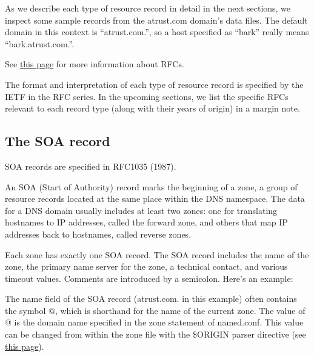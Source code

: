 As we describe each type of resource record in detail in the next
sections, we inspect some sample records from the atrust.com domain's
data files. The default domain in this context is ``atrust.com.'', so a
host specified as ``bark'' really means ``bark.atrust.com.''.

\leavevmode\hypertarget{part0024_split_021.htmlux5cux23_idContainer934}{}%
See
\protect\hyperlink{part0021_split_003.htmlux5cux23_idTextAnchor618}{this
page} for more information about RFCs.

The format and interpretation of each type of resource record is
specified by the IETF in the RFC series. In the upcoming sections, we
list the specific RFCs relevant to each record type (along with their
years of origin) in a margin note.

\protect\hypertarget{part0024_split_022.html}{}{}

\hypertarget{part0024_split_022.htmlux5cux23_idContainer1069}{}
\hypertarget{part0024_split_022.htmlux5cux23calibre_pb_21}{%
\subsection[The SOA
record]{\texorpdfstring{\protect\hypertarget{part0024_split_022.htmlux5cux23_idTextAnchor873}{}{}The
SOA
record}{The SOA record}}\label{part0024_split_022.htmlux5cux23calibre_pb_21}}

\leavevmode\hypertarget{part0024_split_022.htmlux5cux23_idContainer935}{}%
SOA records are specified in RFC1035 (1987).

An
\protect\hypertarget{part0024_split_022.htmlux5cux23_idIndexMarker2068}{}{}\protect\hypertarget{part0024_split_022.htmlux5cux23_idIndexMarker2069}{}{}SOA
(Start of Authority) record marks the beginning of a zone, a group of
resource records located at the same place within the DNS namespace. The
data for a DNS domain usually includes at least two zones: one for
translating hostnames to IP addresses, called the forward zone, and
others that map IP addresses back to hostnames, called reverse zones.

Each zone has exactly one SOA record. The SOA record includes the name
of the zone, the primary name server for the zone, a technical contact,
and various timeout values. Comments are introduced by a semicolon.
Here's an example:


The {name} field of the SOA record (atrust.com. in this example) often
contains the symbol {@}, which is shorthand for the name of the current
zone. The value of {@} is the domain name specified in the {zone}
statement of {named.conf}. This value can be changed from within the
zone file with the {\$ORIGIN} parser directive (see
\protect\hyperlink{part0024_split_020.htmlux5cux23_idTextAnchor867}{this
page}).

